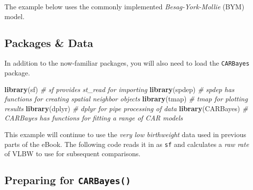 \documentclass[
]{book}
\newenvironment{Shaded}{\begin{snugshade}}{\end{snugshade}}
\newcommand{\AttributeTok}[1]{\textcolor[rgb]{0.13,0.29,0.53}{#1}}
\newcommand{\CommentTok}[1]{\textcolor[rgb]{0.56,0.35,0.01}{\textit{#1}}}
\newcommand{\FunctionTok}[1]{\textcolor[rgb]{0.13,0.29,0.53}{\textbf{#1}}}
\newcommand{\NormalTok}[1]{#1}
\newcommand{\OtherTok}[1]{\textcolor[rgb]{0.56,0.35,0.01}{#1}}
\newcommand{\SpecialCharTok}[1]{\textcolor[rgb]{0.81,0.36,0.00}{\textbf{#1}}}
\newcommand{\StringTok}[1]{\textcolor[rgb]{0.31,0.60,0.02}{#1}}
\begin{document}
The example below uses the commonly implemented \emph{Besag-York-Mollie} (BYM) model.

\hypertarget{packages-data}{%
\subsection{Packages \& Data}\label{packages-data}}

In addition to the now-familiar packages, you will also need to load the \texttt{CARBayes} package.

\begin{Shaded}
\begin{Highlighting}[]
\FunctionTok{library}\NormalTok{(sf)        }\CommentTok{\# sf provides st\_read for importing}
\FunctionTok{library}\NormalTok{(spdep)     }\CommentTok{\# spdep has functions for creating spatial neighbor objects}
\FunctionTok{library}\NormalTok{(tmap)      }\CommentTok{\# tmap for plotting results}
\FunctionTok{library}\NormalTok{(dplyr)     }\CommentTok{\# dplyr for pipe processing of data}
\FunctionTok{library}\NormalTok{(CARBayes)  }\CommentTok{\# CARBayes has functions for fitting a range of CAR models}
\end{Highlighting}
\end{Shaded}

This example will continue to use the \emph{very low birthweight} data used in previous parts of the eBook. The following code reads it in as \texttt{sf} and calculates a \emph{raw rate} of VLBW to use for subsequent comparisons.

\begin{Shaded}
\end{Shaded}

\hypertarget{preparing-for-carbayes}{%
\subsection{\texorpdfstring{Preparing for \texttt{CARBayes()}}{Preparing for CARBayes()}}\label{preparing-for-carbayes}}
\end{document}
